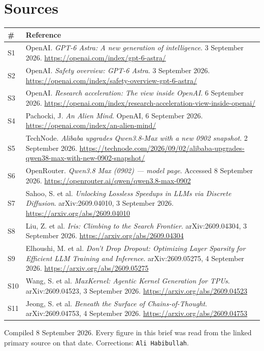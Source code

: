 \documentclass[11pt,a4paper]{article}
\newcommand{\briefdate}{8 September 2026}
\newcommand{\briefauthor}{Ali Habibullah}
\begin{document}
\section{Sources}
{\footnotesize
\begin{tabularx}{\textwidth}{@{}l X@{}}
\toprule
\textbf{\#} & \textbf{Reference} \\
\midrule
S1 & OpenAI. \emph{GPT-6 Astra: A new generation of intelligence}. 3 September 2026. \url{https://openai.com/index/gpt-6-astra/} \\
S2 & OpenAI. \emph{Safety overview: GPT-6 Astra}. 3 September 2026. \url{https://openai.com/index/safety-overview-gpt-6-astra/} \\
S3 & OpenAI. \emph{Research acceleration: The view inside OpenAI}. 6 September 2026. \url{https://openai.com/index/research-acceleration-view-inside-openai/} \\
S4 & Pachocki, J. \emph{An Alien Mind}. OpenAI, 6 September 2026. \url{https://openai.com/index/an-alien-mind/} \\
S5 & TechNode. \emph{Alibaba upgrades Qwen3.8-Max with a new 0902 snapshot}. 2 September 2026. \url{https://technode.com/2026/09/02/alibaba-upgrades-qwen38-max-with-new-0902-snapshot/} \\
S6 & OpenRouter. \emph{Qwen3.8 Max (0902) --- model page}. Accessed 8 September 2026. \url{https://openrouter.ai/qwen/qwen3.8-max-0902} \\
S7 & Sahoo, S. et al. \emph{Unlocking Lossless Speedups in LLMs via Discrete Diffusion}. arXiv:2609.04010, 3 September 2026. \url{https://arxiv.org/abs/2609.04010} \\
S8 & Liu, Z. et al. \emph{Iris: Climbing to the Search Frontier}. arXiv:2609.04304, 3 September 2026. \url{https://arxiv.org/abs/2609.04304} \\
S9 & Elhoushi, M. et al. \emph{Don't Drop Dropout: Optimizing Layer Sparsity for Efficient LLM Training and Inference}. arXiv:2609.05275, 4 September 2026. \url{https://arxiv.org/abs/2609.05275} \\
S10 & Wang, S. et al. \emph{MaxKernel: Agentic Kernel Generation for TPUs}. arXiv:2609.04523, 3 September 2026. \url{https://arxiv.org/abs/2609.04523} \\
S11 & Jeong, S. et al. \emph{Beneath the Surface of Chains-of-Thought}. arXiv:2609.04753, 4 September 2026. \url{https://arxiv.org/abs/2609.04753} \\
\bottomrule
\end{tabularx}}

\vspace{0.8em}
{\footnotesize\color{brandgrey}
Compiled \briefdate. Every figure in this brief was read from the linked primary
source on that date. Corrections: \texttt{\briefauthor}.}
\end{document}
